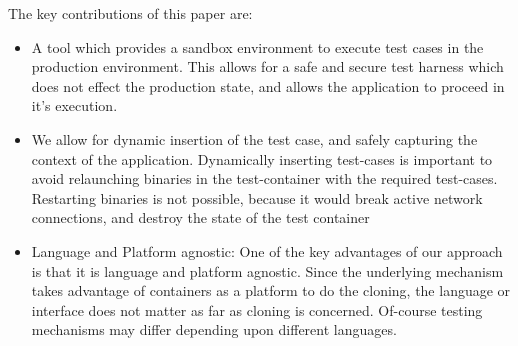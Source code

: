 

The key contributions of this paper are:

\begin{itemize}
\item A tool which provides a sandbox environment to execute test cases in the production environment. 
This allows for a safe and secure test harness which does not effect the production state, and allows the application to proceed in it's execution.
\item We allow for dynamic insertion of the test case, and safely capturing the context of the application. Dynamically inserting test-cases is important to avoid relaunching binaries in the test-container with the required test-cases. 
Restarting binaries is not possible, because it would break active network connections, and destroy the state of the test container
\item Language and Platform agnostic: One of the key advantages of our approach is that it is language and platform agnostic. Since the underlying mechanism takes advantage of containers as a platform to do the cloning, the language or interface does not matter as far as cloning is concerned. 
Of-course testing mechanisms may differ depending upon different languages.
\end{itemize}




